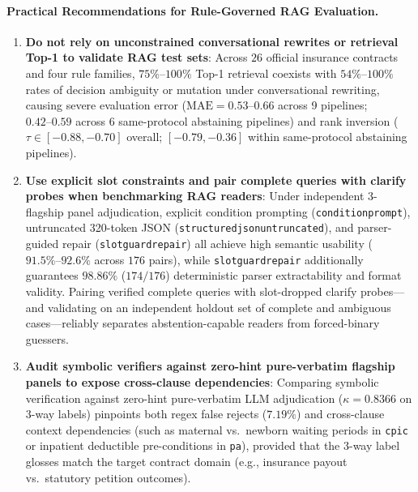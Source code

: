 \documentclass[10pt,twocolumn]{article}
\renewcommand{\_}{\textunderscore\allowbreak}
\begin{document}
\paragraph{Practical Recommendations for Rule-Governed RAG Evaluation.}
\begin{enumerate}[leftmargin=*,nosep]
  \item \textbf{Do not rely on unconstrained conversational rewrites or retrieval Top-1 to validate RAG test sets}: Across $26$ official insurance contracts and four rule families, $75\%\text{--}100\%$ Top-1 retrieval coexists with $54\%\text{--}100\%$ rates of decision ambiguity or mutation under conversational rewriting, causing severe evaluation error ($\text{MAE} = 0.53\text{--}0.66$ across 9 pipelines; $0.42\text{--}0.59$ across 6 same-protocol abstaining pipelines) and rank inversion ($\tau \in [-0.88, -0.70]$ overall; $[-0.79, -0.36]$ within same-protocol abstaining pipelines).
  \item \textbf{Use explicit slot constraints and pair complete queries with clarify probes when benchmarking RAG readers}: Under independent 3-flagship panel adjudication, explicit condition prompting (\texttt{condition\_prompt}), untruncated 320-token JSON (\texttt{structured\_json\_untruncated\_320}), and parser-guided repair (\texttt{slot\_guard\_repair}) all achieve high semantic usability ($91.5\%\text{--}92.6\%$ across $176$ pairs), while \texttt{slot\_guard\_repair} additionally guarantees $98.86\%$ ($174/176$) deterministic parser extractability and format validity. Pairing verified complete queries with slot-dropped clarify probes—and validating on an independent holdout set of complete and ambiguous cases—reliably separates abstention-capable readers from forced-binary guessers.
  \item \textbf{Audit symbolic verifiers against zero-hint pure-verbatim flagship panels to expose cross-clause dependencies}: Comparing symbolic verification against zero-hint pure-verbatim LLM adjudication ($\kappa = 0.8366$ on 3-way labels) pinpoints both regex false rejects ($7.19\%$) and cross-clause context dependencies (such as maternal vs.\ newborn waiting periods in \texttt{cpic\_106702} or inpatient deductible pre-conditions in \texttt{pa\_2650}), provided that the 3-way label glosses match the target contract domain (e.g., insurance payout vs.\ statutory petition outcomes).
\end{enumerate}
\end{document}
